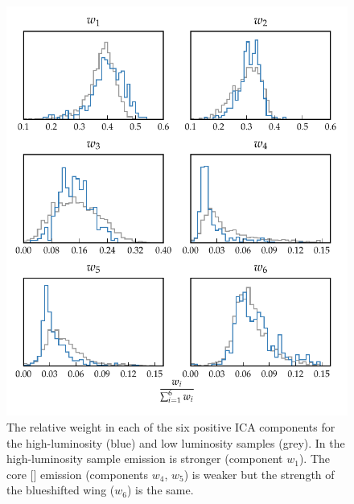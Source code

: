 \begin{figure}
    \includegraphics[width=\textwidth]{figures/chapter04/mfica_component_weights.pdf} 
    \caption[{The relative weight in each of the six positive ICA components for the high-luminosity and low luminosity samples.}]{The relative weight in each of the six positive ICA components for the high-luminosity (blue) and low luminosity samples (grey). In the high-luminosity sample  emission is stronger (component $w_1$). The core [] emission (components $w_4$, $w_5$) is weaker but the strength of the blueshifted wing ($w_6$) is the same.}     
    \label{fig:mfica_component_weights}
\end{figure}

